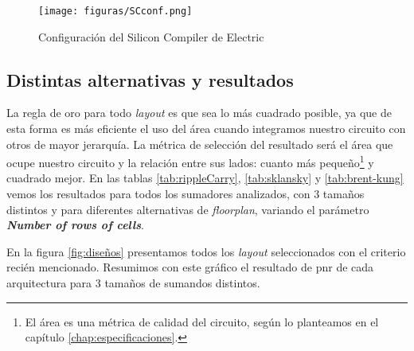 \begin{figure}[h]
\centering
\texttt{[image: figuras/SCconf.png]}
  \caption{Configuración del Silicon Compiler de Electric}
  \label{fig:SCconf}
\end{figure}


\subsection{Distintas alternativas y resultados}
La regla de oro para todo \emph{layout} es que sea lo más cuadrado posible, ya que de esta forma es más eficiente el uso del área cuando integramos nuestro circuito con otros de mayor jerarquía. La métrica de selección del resultado será el área que ocupe nuestro circuito y la relación entre sus lados: cuanto más pequeño\footnote{El área es una métrica de calidad del circuito, según lo planteamos en el capítulo \ref{chap:especificaciones}.} y cuadrado mejor. En las tablas \ref{tab:rippleCarry}, \ref{tab:sklansky} y \ref{tab:brent-kung} vemos los resultados para todos los sumadores analizados, con 3 tamaños distintos y para diferentes alternativas de \emph{floorplan}, variando el parámetro \textbf{\emph{Number of rows of cells}}.

En la figura \ref{fig:diseños} presentamos todos los \emph{layout} seleccionados con el criterio recién mencionado. Resumimos con este gráfico el resultado de \gls{pnr} de cada arquitectura para 3 tamaños de sumandos distintos.
\begin{table}[h]
\centering
{}
\caption{Ubicación y conexionado para Ripple carry en 3 tamaños: 8, 16 y 32 bits. Las dimensiones de los lados y el área están en $\lambda$ y $\lambda^2$ respectivamente.}
\label{tab:rippleCarry}
\end{table}


